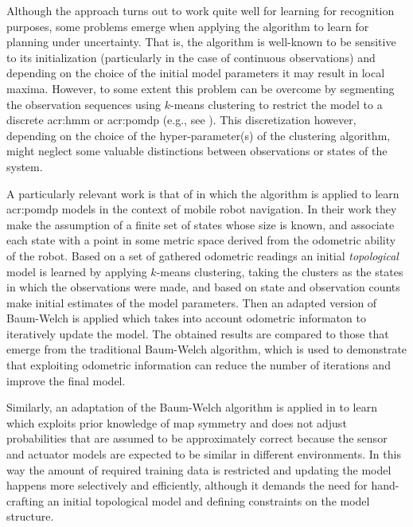 Although the approach turns out to work quite well for learning  for recognition purposes, some problems emerge when applying the algorithm to learn  for planning under uncertainty.
That is, the algorithm is well-known to be sensitive to its initialization (particularly in the case of continuous observations) and depending on the choice of the initial model parameters it may result in local maxima.
However, to some extent this problem can be overcome by segmenting the observation sequences using $k$-means clustering to restrict the model to a discrete \acrshort{acr:hmm} or \acrshort{acr:pomdp} (e.g., see \cite{calinon2007learning}).
This discretization however, depending on the choice of the hyper-parameter(s) of the clustering algorithm, might neglect some valuable distinctions between observations or states of the system.

A particularly relevant work is that of \citeauthor{shatkay1997learning} \cite{shatkay1997learning} in which the algorithm is applied to learn \acrshort{acr:pomdp} models in the context of mobile robot navigation.
In their work they make the assumption of a finite set of states whose size is known, and associate each state with a point in some metric space derived from the odometric ability of the robot.
Based on a set of gathered odometric readings an initial \textit{topological} model is learned by applying $k$-means clustering, taking the clusters as the states in which the observations were made, and based on state and observation counts make initial estimates of the model parameters.
Then an adapted version of Baum-Welch is applied which takes into account odometric informaton to iteratively update the model.
The obtained results are compared to those that emerge from the traditional Baum-Welch algorithm, which is used to demonstrate that exploiting odometric information can reduce the number of iterations and improve the final model.

Similarly, an adaptation of the Baum-Welch algorithm is applied in \cite{koenig1996unsupervised} to learn  which exploits prior knowledge of map symmetry and does not adjust probabilities that are assumed to be approximately correct because the sensor and actuator models are expected to be similar in different environments.
In this way the amount of required training data is restricted and updating the model happens more selectively and efficiently, although it demands the need for hand-crafting an initial topological model and defining constraints on the model structure.

